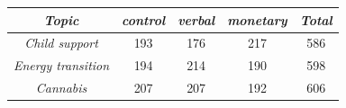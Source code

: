 \begin{tabular}{c c c c c}
      \hline
      \textit{Topic} & \textit{control} & \textit{verbal} & \textit{monetary} & \textit{Total} \\
      \hline
      \textit{Child support} & 193 & 176 & 217 & 586 \\
      \textit{Energy transition} & 194 & 214 & 190 & 598 \\
      \textit{Cannabis} & 207 & 207 & 192 & 606 \\
      \hline
    \end{tabular}
